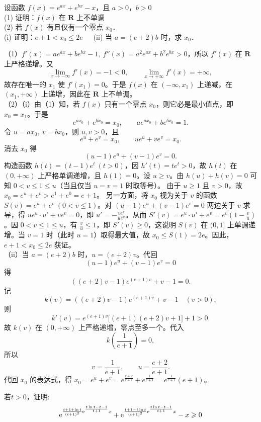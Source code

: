 \begin{example}
设函数 $f(x)=e^{ax}+e^{bx}-x$，且 $a>0$，$b>0$\\
(1) 证明：$f(x)$ 在 $\mathbf{R}$ 上不单调\\
(2) 若 $f(x)$ 有且仅有一个零点 $x_{0}$． \\
(i) 证明：$e+1<x_{0}\leqslant 2e$~~~(ii) 当 $a=(e+2)b$ 时，求 $x_{0}$．
\end{example}
\begin{solution}
（1）$f'(x)=ae^{ax}+be^{bx}-1,\ f''(x)=a^2e^{ax}+b^2e^{bx}>0$，所以 $f'(x)$ 在 $\mathbf R$ 上严格递增。又
\[
\lim_{x\to-\infty}f'(x)=-1<0,\qquad \lim_{x\to+\infty}f'(x)=+\infty,
\]
故存在唯一的 $x_1$ 使 $f'(x_1)=0$。于是 $f(x)$ 在 $(-\infty,x_1)$ 上递减，在 $(x_1,+\infty)$ 上递增，因此在 $\mathbf R$ 上不单调。\\
（2）（i）由（1）知，若 $f(x)$ 只有一个零点 $x_0$，则它必是最小值点，即 $x_0=x_1$。于是
\[
e^{ax_0}+e^{bx_0}=x_0,\qquad ae^{ax_0}+be^{bx_0}=1.
\]
令 $u=ax_0,\ v=bx_0$，则 $u,v>0$，且
\[
e^u+e^v=x_0,\qquad ue^u+ve^v=x_0.
\]
消去 $x_0$ 得
\[
(u-1)e^u+(v-1)e^v=0.
\]
构造函数 $h(t) = (t-1)e^t \ (t > 0)$，因 $h'(t) = te^t > 0$，故 $h(t)$ 在 $(0, +\infty)$ 上严格单调递增，且 $h(1) = 0$。设 $u\ge v$。由 $h(u) + h(v) = 0$ 可知 $0 < v \leqslant 1 \leqslant u$（当且仅当 $u=v=1$ 时取等号）。
由于 $u \geqslant 1$ 且 $v > 0$，故 $x_0 = e^u + e^v > e^1 + e^0 = e+1$。
另一方面，将 $x_0$ 视为关于 $v$ 的函数 $S(v) = e^u + e^v \ (0 < v \leqslant 1)$。对 $(u-1)e^u + (v-1)e^v = 0$ 两边关于 $v$ 求导，得 $u e^u \cdot u' + v e^v = 0$，即 $u' = -\frac{v e^v}{u e^u}$。从而 $S'(v) = e^u \cdot u' + e^v = e^v(1 - \frac{v}{u})$。因 $0 < v \leqslant 1 \leqslant u$，有 $\frac{v}{u} \leqslant 1$，即 $S'(v) \geqslant 0$，这说明 $S(v)$ 在 $(0, 1]$ 上单调递增。当 $v = 1$ 时（此时 $u = 1$）取得最大值，故 $x_0 \leqslant S(1) = 2e$。因此，$e+1 < x_0 \leqslant 2e$ 获证。\\
（ii）当 $a=(e+2)b$ 时，$u=(e+2)v$。代回
\[
(u-1)e^u+(v-1)e^v=0
\]
得
\[
((e+2)v-1)e^{(e+1)v}+v-1=0.
\]
记
\[
k(v)=((e+2)v-1)e^{(e+1)v}+v-1 \quad (v>0),
\]
则
\[
k'(v)=e^{(e+1)v}\bigl[(e+1)(e+2)v+1\bigr]+1>0.
\]
故 $k(v)$ 在 $(0,+\infty)$ 上严格递增，零点至多一个。代入
\[
k\!\left(\frac1{e+1}\right)=0,
\]
所以
\[
v=\frac1{e+1},\qquad u=\frac{e+2}{e+1}.
\]
代回 $x_0$ 的表达式，得 $x_0 = e^u + e^v = e^{\frac{e+2}{e+1}} + e^{\frac{1}{e+1}} = e^{\frac{1}{e+1}}(e + 1)$。
\end{solution}
\newpage
\begin{example}[单调性与极值]
若$t>0$，证明: \[\mathrm{e}^{\frac{t+1+\ln t}{(t+1)^2}\mathrm{e}^{\frac{t\ln t-t-1}{t+1}}x}+\mathrm{e}^{\frac{t+1-t\ln t}{(t+1)^2}\mathrm{e}^{\frac{t\ln t-t-1}{t+1}}x}-x\geqslant0\]
\end{example}
